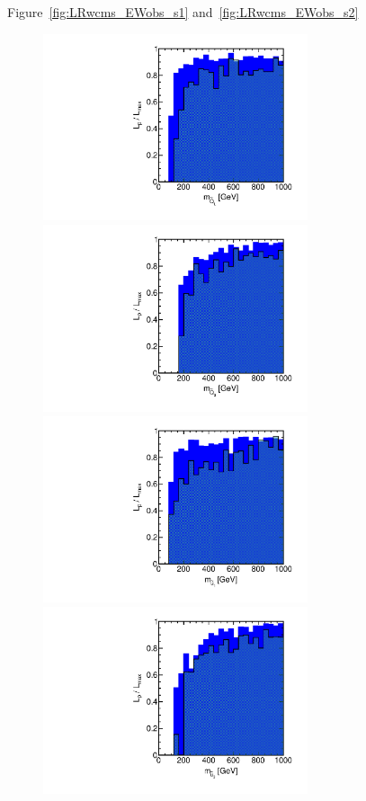 Figure~\ref{fig:LRwcms_EWobs_s1} and~\ref{fig:LRwcms_EWobs_s2}

\begin{figure}[htbp]
\begin{center}
\includegraphics[height=5.5cm]{figs/fig_m_Q_L.pdf} 
\includegraphics[height=5.5cm]{figs/fig_m_Q_3.pdf} \\
\includegraphics[height=5.5cm]{figs/fig_m_u_1.pdf}
\includegraphics[height=5.5cm]{figs/fig_m_u_3.pdf} \\

\end{center}
\end{figure}
